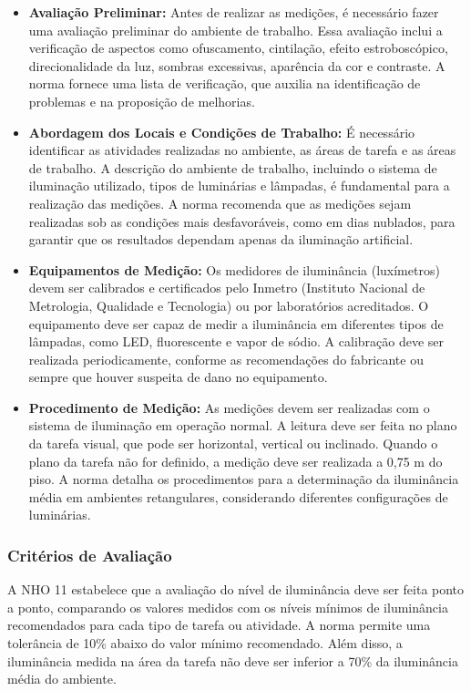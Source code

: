 \begin{itemize}
    \item \textbf{Avaliação Preliminar:} Antes de realizar as medições, é necessário fazer uma avaliação preliminar do ambiente de trabalho. Essa avaliação inclui a verificação de aspectos como ofuscamento, cintilação, efeito estroboscópico, direcionalidade da luz, sombras excessivas, aparência da cor e contraste. A norma fornece uma lista de verificação, que auxilia na identificação de problemas e na proposição de melhorias.
    \item \textbf{Abordagem dos Locais e Condições de Trabalho:} É necessário identificar as atividades realizadas no ambiente, as áreas de tarefa e as áreas de trabalho. A descrição do ambiente de trabalho, incluindo o sistema de iluminação utilizado, tipos de luminárias e lâmpadas, é fundamental para a realização das medições. A norma recomenda que as medições sejam realizadas sob as condições mais desfavoráveis, como em dias nublados, para garantir que os resultados dependam apenas da iluminação artificial.
    \item \textbf{Equipamentos de Medição:} Os medidores de iluminância (luxímetros) devem ser calibrados e certificados pelo Inmetro (Instituto Nacional de Metrologia, Qualidade e Tecnologia) ou por laboratórios acreditados. O equipamento deve ser capaz de medir a iluminância em diferentes tipos de lâmpadas, como LED, fluorescente e vapor de sódio. A calibração deve ser realizada periodicamente, conforme as recomendações do fabricante ou sempre que houver suspeita de dano no equipamento.
    \item \textbf{Procedimento de Medição:} As medições devem ser realizadas com o sistema de iluminação em operação normal. A leitura deve ser feita no plano da tarefa visual, que pode ser horizontal, vertical ou inclinado. Quando o plano da tarefa não for definido, a medição deve ser realizada a 0,75 m do piso. A norma detalha os procedimentos para a determinação da iluminância média em ambientes retangulares, considerando diferentes configurações de luminárias.
\end{itemize}

\subsubsection{Critérios de Avaliação}

A \gls{NHO} 11 estabelece que a avaliação do nível de iluminância deve ser feita ponto a ponto, comparando os valores medidos com os níveis mínimos de iluminância recomendados para cada tipo de tarefa ou atividade. A norma permite uma tolerância de 10\% abaixo do valor mínimo recomendado. Além disso, a iluminância medida na área da tarefa não deve ser inferior a 70\% da iluminância média do ambiente.

